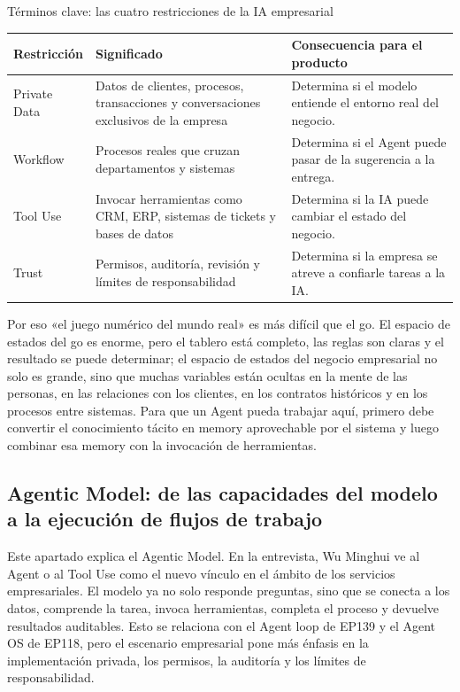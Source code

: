 \begin{knowledgebox}{Términos clave: las cuatro restricciones de la IA empresarial}
\begin{tabularx}{\textwidth}{p{}p{}X}
\toprule
Restricción & Significado & Consecuencia para el producto \\
\midrule
Private Data & Datos de clientes, procesos, transacciones y conversaciones exclusivos de la empresa & Determina si el modelo entiende el entorno real del negocio. \\
Workflow & Procesos reales que cruzan departamentos y sistemas & Determina si el Agent puede pasar de la sugerencia a la entrega. \\
Tool Use & Invocar herramientas como CRM, ERP, sistemas de tickets y bases de datos & Determina si la IA puede cambiar el estado del negocio. \\
Trust & Permisos, auditoría, revisión y límites de responsabilidad & Determina si la empresa se atreve a confiarle tareas a la IA. \\
\bottomrule
\end{tabularx}
\end{knowledgebox}

Por eso «el juego numérico del mundo real» es más difícil que el go. El espacio de estados del go es enorme, pero el tablero está completo, las reglas son claras y el resultado se puede determinar; el espacio de estados del negocio empresarial no solo es grande, sino que muchas variables están ocultas en la mente de las personas, en las relaciones con los clientes, en los contratos históricos y en los procesos entre sistemas. Para que un Agent pueda trabajar aquí, primero debe convertir el conocimiento tácito en memory aprovechable por el sistema y luego combinar esa memory con la invocación de herramientas.

\subsection{Agentic Model: de las capacidades del modelo a la ejecución de flujos de trabajo}

Este apartado explica el Agentic Model. En la entrevista, Wu Minghui ve al Agent o al Tool Use como el nuevo vínculo en el ámbito de los servicios empresariales. El modelo ya no solo responde preguntas, sino que se conecta a los datos, comprende la tarea, invoca herramientas, completa el proceso y devuelve resultados auditables. Esto se relaciona con el Agent loop de EP139 y el Agent OS de EP118, pero el escenario empresarial pone más énfasis en la implementación privada, los permisos, la auditoría y los límites de responsabilidad.

